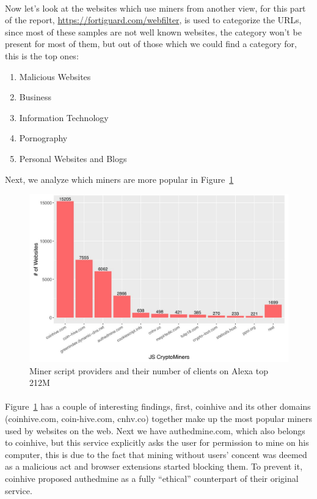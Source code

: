 \documentclass[letterpaper]{scrartcl} %
\numberwithin{equation}{section} %
\numberwithin{figure}{section} %
\numberwithin{table}{section} %
\begin{document}
\paragraph{}
Now let's look at the websites which use miners from another view, for this part of the report, \href{https://fortiguard.com/webfilter}{https://fortiguard.com/webfilter}, is used to categorize the URLs, since most of these samples are not well known websites, the category won't be present for most of them, but out of those which we could find a category for, this is the top ones:

\begin{enumerate}
\item Malicious Websites
\item Business
\item Information Technology
\item Pornography
\item Personal Websites and Blogs
\end{enumerate}

Next, we analyze which miners are more popular in Figure~\ref{fig:miner-providers}

\begin{figure}[t]
\centering
\includegraphics[width=0.8\columnwidth]{figures/miner-providers.jpg}
\caption{Miner script providers and their number of clients on Alexa top 212M}
\label{fig:miner-providers}
\end{figure}

\paragraph{}
Figure~\ref{fig:miner-providers} has a couple of interesting findings, first, coinhive and its other domains (coinhive.com, coin-hive.com, cnhv.co) together make up the most popular miners used by websites on the web. Next we have authedmine.com, which also belongs to coinhive, but this service explicitly asks the user for permission to mine on his computer, this is due to the fact that mining without users' concent was deemed as a malicious act and browser extensions started blocking them. To prevent it, coinhive proposed authedmine as a fully ``ethical'' counterpart of their original service.
\end{document}
